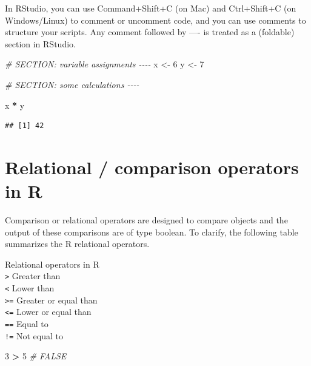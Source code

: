 \documentclass[
]{book}
\newenvironment{Shaded}{\begin{snugshade}}{\end{snugshade}}
\newcommand{\CommentTok}[1]{\textcolor[rgb]{0.56,0.35,0.01}{\textit{#1}}}
\newcommand{\DecValTok}[1]{\textcolor[rgb]{0.00,0.00,0.81}{#1}}
\newcommand{\NormalTok}[1]{#1}
\newcommand{\OtherTok}[1]{\textcolor[rgb]{0.56,0.35,0.01}{#1}}
\newcommand{\SpecialCharTok}[1]{\textcolor[rgb]{0.81,0.36,0.00}{\textbf{#1}}}
\begin{document}
In RStudio, you can use Command+Shift+C (on Mac) and Ctrl+Shift+C (on Windows/Linux) to comment or uncomment code, and you can use comments to structure your scripts.
Any comment followed by ---- is treated as a (foldable) section in RStudio.

\begin{Shaded}
\begin{Highlighting}[]
\CommentTok{\# SECTION: variable assignments {-}{-}{-}{-}}
\NormalTok{x }\OtherTok{\textless{}{-}} \DecValTok{6}
\NormalTok{y }\OtherTok{\textless{}{-}} \DecValTok{7}
\end{Highlighting}
\end{Shaded}

\begin{Shaded}
\begin{Highlighting}[]
\CommentTok{\# SECTION: some calculations {-}{-}{-}{-}}

\NormalTok{x }\SpecialCharTok{*}\NormalTok{ y}
\end{Highlighting}
\end{Shaded}

\begin{verbatim}
## [1] 42
\end{verbatim}

\hypertarget{relational-comparison-operators-in-r}{%
\section{Relational / comparison operators in R}\label{relational-comparison-operators-in-r}}

Comparison or relational operators are designed to compare objects and the output of these comparisons are of type boolean. To clarify, the following table summarizes the R relational operators.

Relational operators in R\\
\texttt{\textgreater{}} Greater than\\
\texttt{\textless{}} Lower than\\
\texttt{\textgreater{}=} Greater or equal than\\
\texttt{\textless{}=} Lower or equal than\\
\texttt{==} Equal to\\
\texttt{!=} Not equal to

\begin{Shaded}
\begin{Highlighting}[]
\DecValTok{3} \SpecialCharTok{\textgreater{}} \DecValTok{5}  \CommentTok{\# FALSE}
\end{Highlighting}
\end{Shaded}
\end{document}
